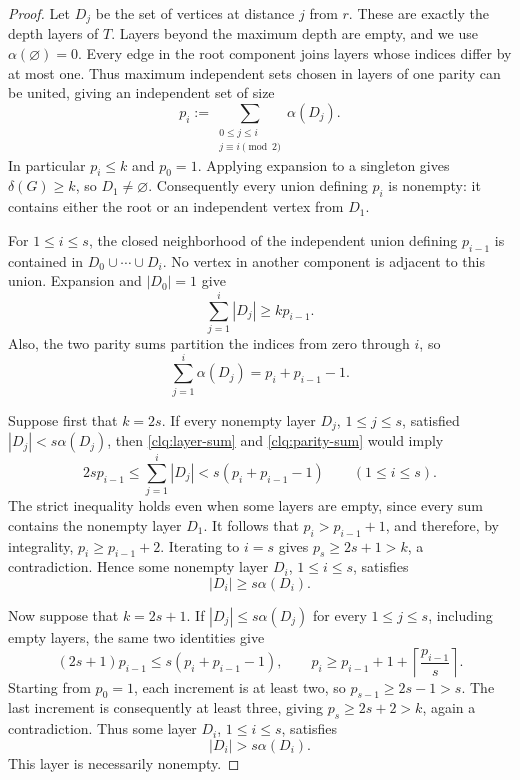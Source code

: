 \begin{proof}
Let \(D_j\) be the set of vertices at distance \(j\) from \(r\).
These are exactly the depth layers of \(T\).  Layers beyond the
maximum depth are empty, and we use \(\alpha(\varnothing)=0\).
Every edge in the root component joins layers whose indices differ
by at most one.  Thus maximum independent sets chosen in layers of
one parity can be united, giving an independent set of size
\[
 p_i:=\sum_{\substack{0\le j\le i\\j\equiv i\pmod2}}
             \alpha(D_j).
\]
In particular \(p_i\le k\) and \(p_0=1\).  Applying expansion to a
singleton gives \(\delta(G)\ge k\), so \(D_1\ne\varnothing\).
Consequently every union defining \(p_i\) is nonempty: it contains
either the root or an independent vertex from \(D_1\).

For \(1\le i\le s\), the closed neighborhood of the independent
union defining \(p_{i-1}\) is contained in
\(D_0\cup\cdots\cup D_i\).  No vertex in another component is
adjacent to this union.  Expansion and \(|D_0|=1\) give
\begin{equation}\label{clq:layer-sum}
 \sum_{j=1}^i|D_j|\ge kp_{i-1}.
\end{equation}
Also, the two parity sums partition the indices from zero through
\(i\), so
\begin{equation}\label{clq:parity-sum}
 \sum_{j=1}^i\alpha(D_j)=p_i+p_{i-1}-1.
\end{equation}

Suppose first that \(k=2s\).  If every nonempty layer \(D_j\),
\(1\le j\le s\), satisfied \(|D_j|<s\alpha(D_j)\), then
\eqref{clq:layer-sum} and \eqref{clq:parity-sum} would imply
\[
 2sp_{i-1}\le\sum_{j=1}^i|D_j|
   <s(p_i+p_{i-1}-1)\qquad(1\le i\le s).
\]
The strict inequality holds even when some layers are empty, since
every sum contains the nonempty layer \(D_1\).
It follows that \(p_i>p_{i-1}+1\), and therefore, by integrality,
\(p_i\ge p_{i-1}+2\).  Iterating to \(i=s\) gives
\(p_s\ge2s+1>k\), a contradiction.  Hence some nonempty layer
\(D_i\), \(1\le i\le s\), satisfies
\begin{equation}\label{clq:even-layer}
 |D_i|\ge s\alpha(D_i).
\end{equation}

Now suppose that \(k=2s+1\).  If \(|D_j|\le s\alpha(D_j)\) for
every \(1\le j\le s\), including empty layers, the same two
identities give
\[
 (2s+1)p_{i-1}\le s(p_i+p_{i-1}-1),
 \qquad
 p_i\ge p_{i-1}+1+\left\lceil\frac{p_{i-1}}s\right\rceil.
\]
Starting from \(p_0=1\), each increment is at least two, so
\(p_{s-1}\ge2s-1>s\).  The last increment is consequently at least
three, giving \(p_s\ge2s+2>k\), again a contradiction.  Thus some
layer \(D_i\), \(1\le i\le s\), satisfies
\begin{equation}\label{clq:odd-layer}
 |D_i|>s\alpha(D_i).
\end{equation}
This layer is necessarily nonempty.


\end{proof}
